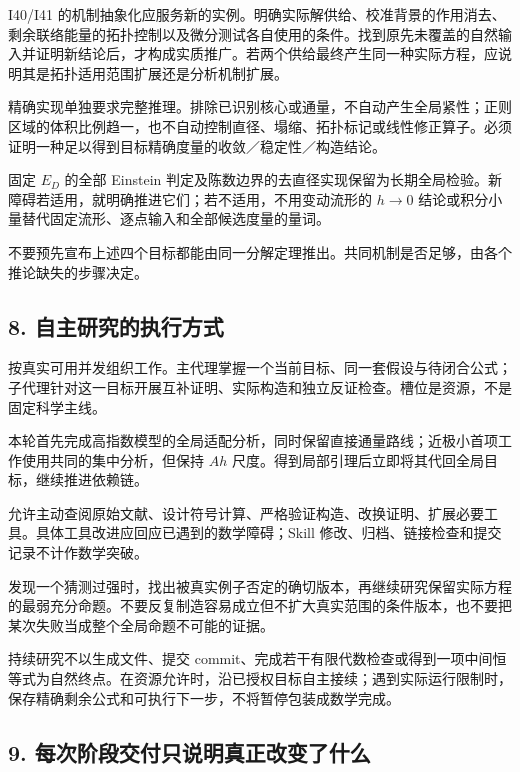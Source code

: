 \documentclass[
  10pt,
]{article}
\begin{document}
I40/I41
的机制抽象化应服务新的实例。明确实际解供给、校准背景的作用消去、剩余联络能量的拓扑控制以及微分测试各自使用的条件。找到原先未覆盖的自然输入并证明新结论后，才构成实质推广。若两个供给最终产生同一种实际方程，应说明其是拓扑适用范围扩展还是分析机制扩展。

精确实现单独要求完整推理。排除已识别核心或通量，不自动产生全局紧性；正则区域的体积比例趋一，也不自动控制直径、塌缩、拓扑标记或线性修正算子。必须证明一种足以得到目标精确度量的收敛／稳定性／构造结论。

固定 \(E_D\) 的全部 Einstein
判定及陈数边界的去直径实现保留为长期全局检验。新障碍若适用，就明确推进它们；若不适用，不用变动流形的
\(h\to0\) 结论或积分小量替代固定流形、逐点输入和全部候选度量的量词。

不要预先宣布上述四个目标都能由同一分解定理推出。共同机制是否足够，由各个推论缺失的步骤决定。

\hypertarget{ux81eaux4e3bux7814ux7a76ux7684ux6267ux884cux65b9ux5f0f}{%
\subsection{8.
自主研究的执行方式}\label{ux81eaux4e3bux7814ux7a76ux7684ux6267ux884cux65b9ux5f0f}}

按真实可用并发组织工作。主代理掌握一个当前目标、同一套假设与待闭合公式；子代理针对这一目标开展互补证明、实际构造和独立反证检查。槽位是资源，不是固定科学主线。

本轮首先完成高指数模型的全局适配分析，同时保留直接通量路线；近极小首项工作使用共同的集中分析，但保持
\(Ah\) 尺度。得到局部引理后立即将其代回全局目标，继续推进依赖链。

允许主动查阅原始文献、设计符号计算、严格验证构造、改换证明、扩展必要工具。具体工具改进应回应已遇到的数学障碍；Skill
修改、归档、链接检查和提交记录不计作数学突破。

发现一个猜测过强时，找出被真实例子否定的确切版本，再继续研究保留实际方程的最弱充分命题。不要反复制造容易成立但不扩大真实范围的条件版本，也不要把某次失败当成整个全局命题不可能的证据。

持续研究不以生成文件、提交
commit、完成若干有限代数检查或得到一项中间恒等式为自然终点。在资源允许时，沿已授权目标自主接续；遇到实际运行限制时，保存精确剩余公式和可执行下一步，不将暂停包装成数学完成。

\hypertarget{ux6bcfux6b21ux9636ux6bb5ux4ea4ux4ed8ux53eaux8bf4ux660eux771fux6b63ux6539ux53d8ux4e86ux4ec0ux4e48}{%
\subsection{9.
每次阶段交付只说明真正改变了什么}\label{ux6bcfux6b21ux9636ux6bb5ux4ea4ux4ed8ux53eaux8bf4ux660eux771fux6b63ux6539ux53d8ux4e86ux4ec0ux4e48}}
\end{document}
